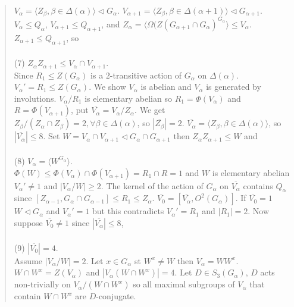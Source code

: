 \begin{quote}
$V_{\alpha} = \langle Z_{\beta}, \beta \in \Delta(\alpha) \rangle \lhd G_{\alpha}$.
$V_{\alpha + 1} = \langle Z_{\beta}, \beta \in \Delta(\alpha + 1) \rangle \lhd G_{\alpha + 1}$.
$V_{\alpha} \leq Q_{\alpha}$,
$V_{\alpha + 1} \leq Q_{\alpha + 1}$, and
$Z_{\alpha} = \langle \Omega(Z(G_{\alpha + 1} \cap G_{\alpha})^{G_{\alpha}} \rangle \leq V_{\alpha}$.
$Z_{\alpha + 1} \leq Q_{\alpha + 1}$, so \\
\\
(7) $Z_{\alpha} Z_{\alpha + 1} \leq V_{\alpha} \cap V_{\alpha + 1}$.\\
Since $R_1 \leq Z(G_{\alpha})$ is a $2$-transitive action of $G_{\alpha}$ on $\Delta(\alpha )$.
${V_{\alpha}}' = R_1 \leq Z(G_{\alpha})$.
We show $V_{\alpha}$ is abelian and $V_{\alpha}$ is generated by involutions.
$V_{\alpha} / R_1$ is elementary abelian so $R_1 = \Phi(V_{\alpha})$ and $R = \Phi(V_{\alpha + 1})$, put
${\overline {V_{\alpha}}} = V_{\alpha} / Z_{\alpha}$.  We get $Z_{\beta}/(Z_{\alpha} \cap Z_{\beta})= 2, \forall \beta \in \Delta(\alpha)$,
so $|{\overline {Z_{\beta}}}| = 2$.  ${\overline {V_{\alpha}}} = \langle Z_{\beta}, \beta \in \Delta(\alpha)\rangle$, so 
$|{\overline {V_{\alpha}}}| \leq 8$.  Set $W= V_{\alpha} \cap V_{\alpha + 1} \lhd G_{\alpha} \cap G_{\alpha + 1}$ then
$Z_{\alpha}Z_{\alpha + 1} \leq W$ and\\
\\
(8)  $V_{\alpha} = \langle W^{G_{\alpha}} \rangle$.\\
$\Phi(W) \leq \Phi(V_{\alpha}) \cap \Phi(V_{\alpha + 1}) =R_1 \cap R =1$ and $W$ is elementary abelian
${V_{\alpha}}' \ne 1$ and $|V_{\alpha} / W| \geq 2$.
The kernel of the action of $G_{\alpha}$ on ${\overline {V_{\alpha}}}$ contains $Q_{\alpha}$ since
$[Z_{\alpha - 1} , G_{\alpha} \cap G_{\alpha - 1}] \leq R_1 \leq Z_{\alpha}$.
${\overline {V_0}} = [{\overline {V_{\alpha}}}, O^2(G_{\alpha})]$.
If ${\overline {V_0}} = 1$ $W \lhd G_{\alpha}$ and ${V_{\alpha}}' =1$ but this contradicts ${V_{\alpha}}' = R_1$ and
$|R_1| = 2$.
Now suppose ${\overline {V_0}} \ne 1$ since $|{\overline {V_{\alpha}}}| \leq 8$, \\
\\
(9) $|{\overline {V_0}}| = 4$.\\
Assume $|V_{\alpha} / W| = 2$.  Let $x \in G_{\alpha}$ st $W^x \ne W$
then $V_{\alpha} = W W^x$.
$W  \cap W^x = Z(V_{\alpha})$ and $|V_{\alpha} (W \cap W^x)| = 4$.  Let $D \in S_3(G_{\alpha})$, $D$ acts non-trivially on
$V_{\alpha} / (W \cap W^x)$ so all maximal subgroups of $V_{\alpha}$ that contain $W \cap W^x$ are $D$-conjugate.

\end{quote}
